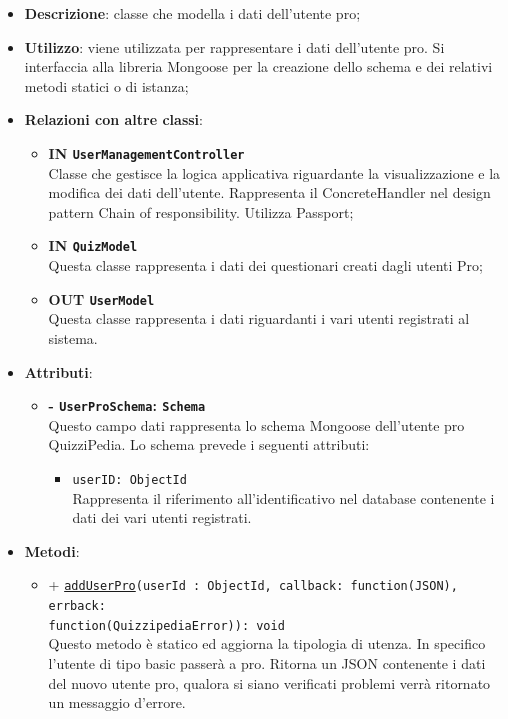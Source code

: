 \begin{itemize}
	\item \textbf{Descrizione}: classe che modella i dati dell'utente pro;
	\item \textbf{Utilizzo}: viene utilizzata per rappresentare i dati dell'utente pro. Si interfaccia alla libreria Mongoose per la creazione dello schema e dei relativi metodi statici o di istanza;
	\item \textbf{Relazioni con altre classi}:
		\begin{itemize}
			\item \textbf{IN \texttt {UserManagementController}} \\
			Classe che gestisce la logica applicativa riguardante la visualizzazione e la modifica dei dati dell'utente.
Rappresenta il ConcreteHandler nel design pattern Chain of responsibility. Utilizza Passport;
			\item \textbf{IN \texttt{QuizModel}} \\
			Questa classe rappresenta i dati dei questionari creati dagli utenti Pro;
			\item \textbf{OUT \texttt{UserModel}} \\
			Questa classe rappresenta i dati riguardanti i vari utenti registrati al sistema.
		\end{itemize}
	\item \textbf{Attributi}:
		\begin{itemize}
			\item \textbf{- \texttt{UserProSchema}: \texttt{Schema}} \\
			Questo campo dati rappresenta lo schema Mongoose dell'utente pro QuizziPedia. Lo schema prevede i seguenti attributi:
			\begin{itemize}
				\item 
					\texttt{userID: ObjectId}\\ Rappresenta il riferimento all'identificativo nel database contenente i dati dei vari utenti registrati.
			\end{itemize}		
		\end{itemize}	
	\item \textbf{Metodi}:
		\begin{itemize}
		\item
		+ \texttt{\underline{addUserPro}(userId : ObjectId, callback: function(JSON), errback: \\function(QuizzipediaError)): void} \\	
		Questo metodo è statico ed aggiorna la tipologia di utenza. In specifico l'utente di tipo basic passerà a pro. Ritorna un JSON contenente i dati del nuovo utente pro, qualora si siano verificati problemi verrà ritornato un messaggio d'errore.	\\	

\end{itemize}
\end{itemize}
